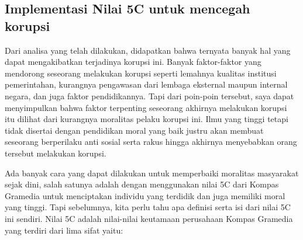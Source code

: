 \documentclass[11pt]{article}
\begin{document}
\subsection{Implementasi Nilai 5C untuk mencegah korupsi}
Dari analisa yang telah dilakukan, didapatkan bahwa ternyata banyak hal yang
dapat mengakibatkan terjadinya korupsi ini. Banyak faktor-faktor yang mendorong
seseorang melakukan korupsi seperti lemahnya kualitas institusi pemerintahan,
kurangnya pengawasan dari lembaga eksternal maupun internal negara, dan juga
faktor pendidikannya. Tapi dari poin-poin tersebut, saya dapat menyimpulkan
bahwa faktor terpenting seseorang akhirnya melakukan korupsi itu dilihat dari
kurangnya moralitas pelaku korupsi ini. Ilmu yang tinggi tetapi tidak disertai
dengan pendidikan moral yang baik justru akan membuat seseorang berperilaku anti
sosial serta rakus hingga akhirnya menyebabkan orang tersebut melakukan korupsi.

Ada banyak cara yang dapat dilakukan untuk memperbaiki moralitas masyarakat sejak
dini, salah satunya adalah dengan menggunakan nilai 5C dari Kompas Gramedia untuk
menciptakan individu yang terdidik dan juga memiliki moral yang tinggi. Tapi
sebelumnya, kita perlu tahu apa definisi serta isi dari nilai 5C ini sendiri. 
Nilai 5C adalah nilai-nilai keutamaan perusahaan Kompas Gramedia yang terdiri 
dari lima sifat yaitu:
\end{document}
